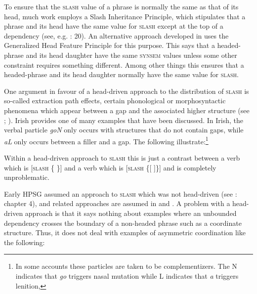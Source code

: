 \documentclass[output=paper
                ,modfonts
                ,nonflat
	        ,collection
	        ,collectionchapter
	        ,collectiontoclongg
 	        ,biblatex
                ,babelshorthands
                ,newtxmath
                ,draftmode
                ,colorlinks, citecolor=brown
]{./langsci/langscibook}
\begin{document}
{To ensure that the \textsc{slash} value of a phrase is normally the same as that
of its head, much work employs a Slash Inheritance Principle, which
stipulates that a phrase and its head have the same value for \textsc{slash}
except at the top of a dependency (see, e.g. \citealt{Bouma:Malouf:Sag:01}:
20). An alternative approach developed in \citet{Ginzburg:Sag:01} uses
the Generalized Head Feature Principle for this purpose. This says that
a headed-phrase and its head daughter have the same \textsc{synsem} values unless
some other constraint requires something different. Among other things
this ensures that a headed-phrase and its head daughter normally have
the same value for \textsc{slash}.

One argument in favour of a head-driven approach to the distribution
of \textsc{slash} is so-called extraction path effects, certain phonological or
morphosyntactic phenomena which appear between a gap and the
associated higher structure (see \citealt{hukari.levine:adjunct};
\citealt[Section~3.2]{Bouma:Malouf:Sag:01}). Irish provides one of many
examples that have been discussed. In Irish, the verbal particle
\emph{goN} only occurs with structures that do not contain gaps, while
\emph{aL} only occurs between a filler and a gap. The following
illustrate:\footnote{In some accounts these particles are taken to be
  complementizers. The N indicates that \emph{go} triggers nasal
  mutation while L indicates that \emph{a} triggers lenition,}

\begin{exe} \ex \begin{xlist} \label{ex:UDC:34}

\end{xlist}
\end{exe}

\noindent
Within a head-driven approach to \textsc{slash} this is just a contrast between a
verb which is {[}\textsc{slash} \{ \}{]} and a verb which is {[}\textsc{slash}
\{{[} {]}\}{]} and is completely unproblematic.

Early HPSG assumed an approach to \textsc{slash} which was not
head-driven (see \citealt{Pollard:Sag:94}: chapter 4), and related
approaches are assumed in \citet{Levine:Hukari:06} and \citet{Chaves:12}.  A problem
with a head-driven approach is that it says nothing about examples
where an unbounded dependency crosses the boundary of a non-headed
phrase such as a coordinate structure. Thus, it does not deal with
examples of asymmetric coordination like the following:

}
\end{document}
